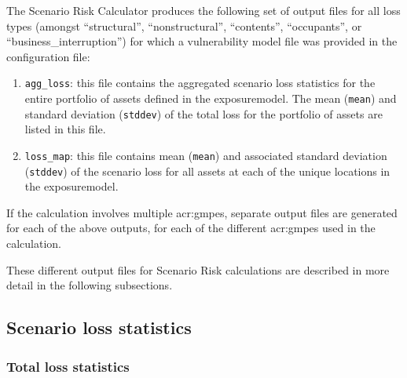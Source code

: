 The Scenario Risk Calculator produces the following set of output files for
all loss types (amongst ``structural'', ``nonstructural'', ``contents'',
``occupants'', or ``business\_interruption'') for which a vulnerability model
file was provided in the configuration file:

\begin{enumerate}

  \item \Verb+agg_loss+: this file contains the aggregated scenario
    loss statistics for the entire portfolio of \glspl{asset} defined
    in the \gls{exposuremodel}. The mean (\Verb+mean+) and standard
    deviation (\Verb+stddev+) of the total loss for the portfolio of
    \glspl{asset} are listed in this file.

  \item \Verb+loss_map+: this file contains mean (\Verb+mean+) and
    associated standard deviation (\Verb+stddev+) of the scenario loss for all
    \glspl{asset} at each of the unique locations in the \gls{exposuremodel}.

\end{enumerate}

If the calculation involves multiple \glspl{acr:gmpe}, separate output files
are generated for each of the above outputs, for each of the different
\glspl{acr:gmpe} used in the calculation.

These different output files for Scenario Risk calculations are described in
more detail in the following subsections.


\subsection{Scenario loss statistics}
\label{subsec:scenario_loss_statistics}



\subsubsection{Total loss statistics}
\label{subsubsec:scenario_total_loss_statistics}

